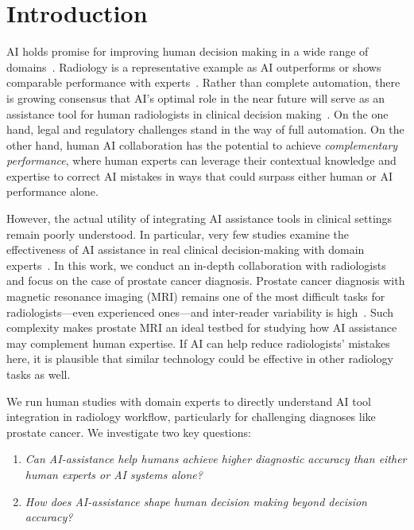 
\section{Introduction}

AI holds promise for improving human decision making in a wide range of domains~\citep{lai2023towards,kleinberg2018human,reverberi2022experimental,scherer2019artificial,alon2023human}. 
Radiology is a representative example as 
AI outperforms or shows comparable performance with experts~\cite{hosny2018artificial,wu2019deep,rodriguez2019stand,rauschecker2020artificial,SahaBosmaTwilt2024,kromrey2024navigating,pauwels2021artificial,mckinney2020international}.
Rather than complete automation, there is growing consensus that AI's optimal role in the near future will serve as an assistance tool for human radiologists in clinical decision making~\cite{langlotz2019will, agarwal2023combining, norden2022ai, harvey2020fda}.
On the one hand, legal and regulatory challenges stand in the way of full automation. 
On the other hand, human AI collaboration has the potential to achieve \textit{complementary performance}, where human experts can leverage their contextual knowledge and expertise to correct AI mistakes in ways that could surpass either human or AI performance alone. 

However, the actual utility of integrating AI assistance tools in clinical settings remain poorly understood. 
In particular, very few studies examine the effectiveness of AI assistance in real clinical decision-making with domain experts~\cite{ouanes2024effectiveness, armando2023clinical}.
In this work, we conduct an in-depth collaboration with radiologists and focus on the case of prostate cancer diagnosis.
Prostate cancer diagnosis with magnetic resonance imaging (MRI) remains one of the most difficult tasks for radiologists—even experienced ones—and inter-reader variability is high~\cite{de2014accuracy,chatterjee2025prospective}. Such complexity makes prostate MRI an ideal testbed for studying how AI assistance may complement human expertise. If AI can help reduce radiologists' mistakes here, it is plausible that similar technology could be effective in other radiology tasks as well.








We run human studies with domain experts to directly understand AI tool integration in radiology workflow, particularly for challenging diagnoses like prostate cancer. We investigate two key questions:
\begin{enumerate}[label=\textbf{Q\arabic*:}, itemsep=0.2em]
    \item \emph{Can AI-assistance help humans achieve higher diagnostic accuracy 
    than either human experts or AI systems alone?}
    \item \emph{How does AI-assistance shape human decision making beyond decision accuracy?}
\end{enumerate}

